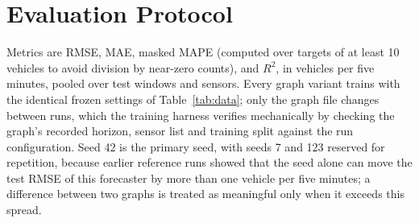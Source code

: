 \documentclass[MTech]{ugthesis}
\begin{document}
\section{Evaluation Protocol}
Metrics are \ac{RMSE}, \ac{MAE}, masked \ac{MAPE} (computed over targets of at least 10 vehicles to avoid division by near-zero counts), and $R^2$, in vehicles per five minutes, pooled over test windows and sensors. Every graph variant trains with the identical frozen settings of Table~\ref{tab:data}; only the graph file changes between runs, which the training harness verifies mechanically by checking the graph's recorded horizon, sensor list and training split against the run configuration. Seed 42 is the primary seed, with seeds 7 and 123 reserved for repetition, because earlier reference runs showed that the seed alone can move the test RMSE of this forecaster by more than one vehicle per five minutes; a difference between two graphs is treated as meaningful only when it exceeds this spread.

\begin{singlespace}
  
\end{singlespace}
\end{document}
